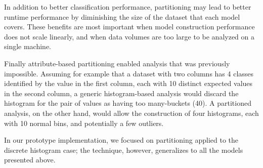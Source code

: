 In addition to better classification performance, partitioning may lead to better runtime performance by diminishing the size of the dataset that each model covers. These benefits are most important when model construction performance does not scale linearly, and when data volumes are too large to be analyzed on a single machine. 

Finally attribute-based partitioning enabled analysis that was previously impossible. Assuming for example that a dataset with two columns has 4 classes identified by the value in the first column, each with 10 distinct expected values in the second column, a generic histogram-based analysis would discard the histogram for the pair of values as having too many-buckets (40). A partitioned analysis, on the other hand, would allow the construction of four histograms, each with 10 normal bins, and potentially a few outliers.

In our prototype implementation, we focused on partitioning applied to the discrete histogram case; the technique, however, generalizes to all the models presented above.

